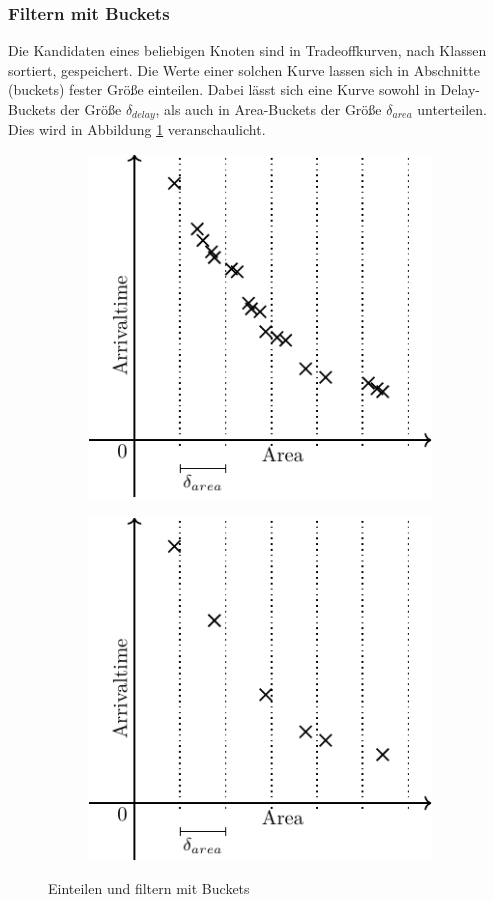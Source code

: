 \documentclass[11pt, a4paper, german]{article}
\begin{document}
\subsubsection{Filtern mit Buckets}
\label{subsubsec:filtern}
Die Kandidaten eines beliebigen Knoten sind in Tradeoffkurven, nach Klassen sortiert, gespeichert. Die Werte einer solchen Kurve lassen sich in Abschnitte (buckets) fester Größe einteilen. Dabei lässt sich eine Kurve sowohl in Delay-Buckets  der Größe $\delta_{delay}$, als auch in Area-Buckets der Größe $\delta_{area}$ unterteilen. Dies wird in Abbildung \ref{bild:tradeoff_kurven_filtern} veranschaulicht.\\
\begin{figure}[h]
\centering
\begin{subfigure}{.5\textwidth}
  \centering
  \includegraphics[width=.7\linewidth]{pictures/compiled/tradeoff_kurve_buckets}
\end{subfigure}%
\begin{subfigure}{.5\textwidth}
  \centering
  \includegraphics[width=.7\linewidth]{pictures/compiled/tradeoff_kurve_filtered}
\end{subfigure}
\caption{Einteilen und filtern mit Buckets}
\label{bild:tradeoff_kurven_filtern}
\end{figure}
\end{document}
